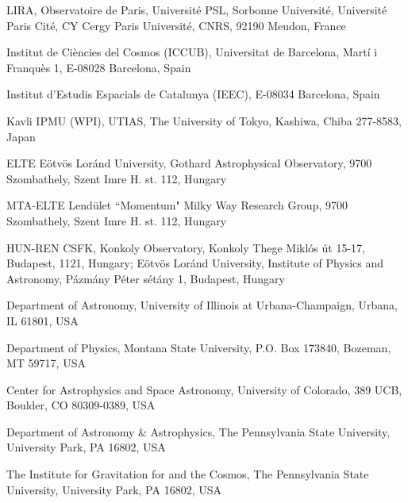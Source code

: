 \documentclass{natureprintstyle}
\begin{document}
{\begin{affiliations}
\item LIRA, Observatoire de Paris, Universit\'e PSL, Sorbonne Universit\'e, Universit\'e Paris Cit\'e, CY Cergy Paris Universit\'e, CNRS, 92190 Meudon, France
\item Institut de Ci\`{e}ncies del Cosmos (ICCUB), Universitat de Barcelona, Mart\'{i} i Franqu\`{e}s 1, E-08028 Barcelona, Spain
\item Institut d'Estudis Espacials de Catalunya (IEEC), E-08034 Barcelona, Spain
\item Kavli IPMU (WPI), UTIAS, The University of Tokyo, Kashiwa, Chiba 277-8583, Japan
\item ELTE E\"otv\"os Lor\'and University, Gothard Astrophysical Observatory, 9700 Szombathely, Szent Imre H. st. 112, Hungary
\item MTA-ELTE Lend{\"u}let ``Momentum" Milky Way Research Group, 9700 Szombathely, Szent Imre H. st. 112, Hungary
\item HUN-REN CSFK, Konkoly Observatory, Konkoly Thege Mikl\'os \'ut 15-17, Budapest, 1121, Hungary; E\"otv\"os Lor\'and University, Institute of Physics and Astronomy, P\'azm\'any P\'eter s\'et\'any 1, Budapest, Hungary
\item Department of Astronomy, University of Illinois at Urbana-Champaign, Urbana, IL 61801, USA
\item Department of Physics, Montana State University, P.O. Box 173840, Bozeman, MT 59717, USA
\item Center for Astrophysics and Space Astronomy, University of Colorado, 389 UCB, Boulder, CO 80309-0389, USA
\item Department of Astronomy \& Astrophysics, The Pennsylvania State University, University Park, PA 16802, USA
\item The Institute for Gravitation for and the Cosmos, The Pennsylvania State University, University Park, PA 16802, USA
\end{affiliations}
}
\end{document}
